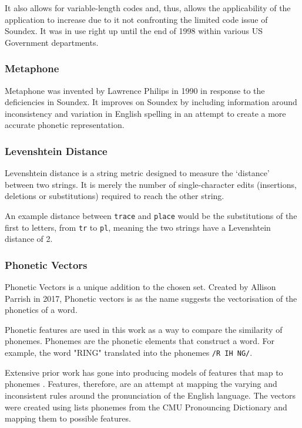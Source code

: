 It also allows for variable-length codes and, thus, allows the applicability of the application to increase due to it not confronting the limited code issue of Soundex. It was in use right up until the end of 1998 within various US Government departments.

\subsubsection*{Metaphone}
\label{sec:metaphone}
Metaphone was invented by Lawrence Philips in 1990\cite{philips1990hanging} in response to the deficiencies in Soundex. It improves on Soundex by including information around inconsistency and variation in English spelling in an attempt to create a more accurate phonetic representation.

\subsubsection{Levenshtein Distance}
\label{sec:leven}
Levenshtein distance is a string metric designed to measure the `distance' between two strings. It is merely the number of single-character edits (insertions, deletions or substitutions) required to reach the other string.

An example distance between \verb|trace| and \verb|place| would be the substitutions of the first to letters, from \verb|tr| to \verb|pl|, meaning the two strings have a Levenshtein distance of 2.

\subsubsection{Phonetic Vectors}
\label{sec:phonetic_vectors}
Phonetic Vectors is a unique addition to the chosen set. Created by Allison Parrish in 2017\cite{parrish2017poetic}, Phonetic vectors is as the name suggests the vectorisation of the phonetics of a word.

Phonetic features are used in this work as a way to compare the similarity of phonemes. Phonemes are the phonetic elements that construct a word. For example, the word "RING" translated into the phonemes \verb|/R IH NG/|. 

Extensive prior work has gone into producing models of features that map to phonemes \cite{chomsky1968sound}\cite{ladefoged1969measurement}\cite{bradlow2010perceptual}. Features, therefore, are an attempt at mapping the varying and inconsistent rules around the pronunciation of the English language. The vectors were created using lists phonemes from the CMU Pronouncing Dictionary and mapping them to possible features.

